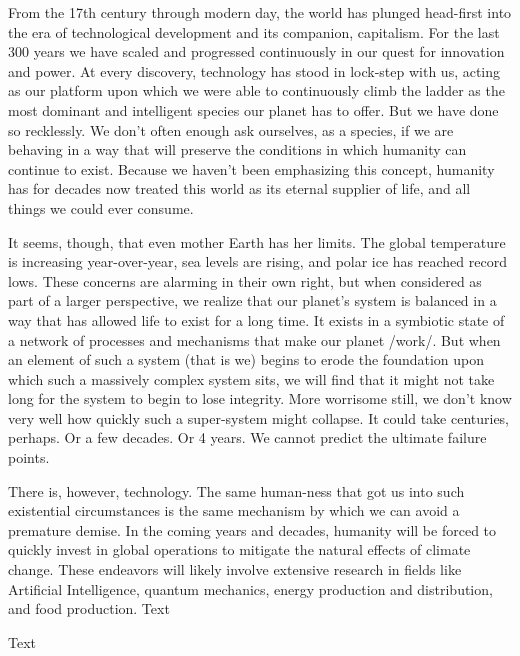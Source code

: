 \documentclass[12pt,letterpaper]{article}
\begin{document}
  From the 17th century through modern day, the world has plunged head-first
into the era of technological development and its companion, capitalism. For
the last 300 years we have scaled and progressed continuously in our quest
for innovation and power. At every discovery, technology has stood in lock-step
with us, acting as our platform upon which we were able to continuously climb
the ladder as the most dominant and intelligent species our planet has to offer.
But we have done so recklessly. We don't often enough ask ourselves, as a
species, if we are behaving in a way that will preserve the conditions in which
humanity can continue to exist. Because we haven't been emphasizing this
concept, humanity has for decades now treated this world as its eternal supplier
of life, and all things we could ever consume.

It seems, though, that even mother Earth has her limits. The global temperature
is increasing year-over-year, sea levels are rising, and polar ice has reached
record lows. These concerns are alarming in their own right, but when considered
as part of a larger perspective, we realize that our planet's system is balanced
in a way that has allowed life to exist for a long time. It exists in a
symbiotic state of a network of processes and mechanisms that make our planet
/work/. But when an element of such a system (that is we) begins to erode the
foundation upon which such a massively complex system sits, we will find that
it might not take long for the system to begin to lose integrity. More worrisome
still, we don't know very well how quickly such a super-system might collapse.
It could take centuries, perhaps. Or a few decades. Or 4 years. We cannot
predict the ultimate failure points.

There is, however, technology. The same human-ness that got us into such
existential circumstances is the same mechanism by which we can avoid a
premature demise. In the coming years and decades, humanity will be forced to
quickly invest in global operations to mitigate the natural effects of climate
change. These endeavors will likely involve extensive research in fields like
Artificial Intelligence, quantum mechanics, energy production and distribution,
and food production. Text \cite[55]{Barrett2009}

Text

\printbibliography
\end{document}
